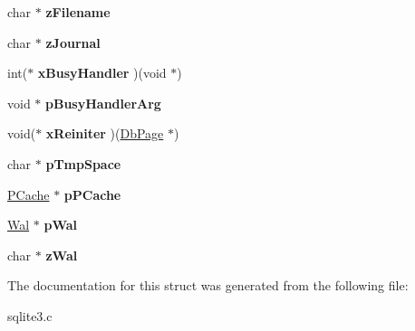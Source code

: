 \begin{DoxyCompactItemize}
\item 
\hypertarget{struct_pager_a2a55a044468f8658b7993e57087a5561}{char $\ast$ {\bfseries z\-Filename}}\label{struct_pager_a2a55a044468f8658b7993e57087a5561}

\item 
\hypertarget{struct_pager_ab36ce1f606c407ad3fc56a3651f5a319}{char $\ast$ {\bfseries z\-Journal}}\label{struct_pager_ab36ce1f606c407ad3fc56a3651f5a319}

\item 
\hypertarget{struct_pager_ac8477f7cc39fefd81b4089994e13d215}{int($\ast$ {\bfseries x\-Busy\-Handler} )(void $\ast$)}\label{struct_pager_ac8477f7cc39fefd81b4089994e13d215}

\item 
\hypertarget{struct_pager_a7a685e7a8dcbcd725c5a982fd8deb91b}{void $\ast$ {\bfseries p\-Busy\-Handler\-Arg}}\label{struct_pager_a7a685e7a8dcbcd725c5a982fd8deb91b}

\item 
\hypertarget{struct_pager_a632d3c81743a7f9104337ae3d45af04c}{void($\ast$ {\bfseries x\-Reiniter} )(\hyperlink{struct_pg_hdr}{Db\-Page} $\ast$)}\label{struct_pager_a632d3c81743a7f9104337ae3d45af04c}

\item 
\hypertarget{struct_pager_a64934188c72599e0be9ae54d3fc1cc92}{char $\ast$ {\bfseries p\-Tmp\-Space}}\label{struct_pager_a64934188c72599e0be9ae54d3fc1cc92}

\item 
\hypertarget{struct_pager_ae2495e45e354e92a858144386f91cab3}{\hyperlink{struct_p_cache}{P\-Cache} $\ast$ {\bfseries p\-P\-Cache}}\label{struct_pager_ae2495e45e354e92a858144386f91cab3}

\item 
\hypertarget{struct_pager_a2c759424108248d8b08e6f400fab14dd}{\hyperlink{struct_wal}{Wal} $\ast$ {\bfseries p\-Wal}}\label{struct_pager_a2c759424108248d8b08e6f400fab14dd}

\item 
\hypertarget{struct_pager_ac63ab281e48f9ac8521b85c1a90475b3}{char $\ast$ {\bfseries z\-Wal}}\label{struct_pager_ac63ab281e48f9ac8521b85c1a90475b3}

\end{DoxyCompactItemize}


The documentation for this struct was generated from the following file\-:\begin{DoxyCompactItemize}
\item 
sqlite3.\-c\end{DoxyCompactItemize}
